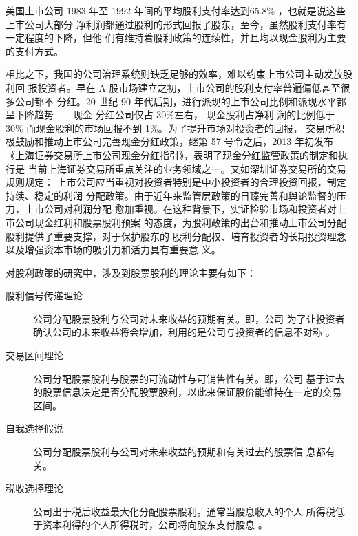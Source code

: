 \documentclass[../main]{subfiles}
\begin{document}
美国上市公司 1983 年至 1992 年间的平均股利支付率达到65.8\%
，\cite{李常青1999我国上市公司股利政策现状及其成因}也就是说这些上市公司大部分
净利润都通过股利的形式回报了股东，至今，虽然股利支付率有一定程度的下降，但他
们有维持着股利政策的连续性，并且均以现金股利为主要的支付方式。

相比之下，我国的公司治理系统则缺乏足够的效率，难以约束上市公司主动发放股利回
报投资者。早在 A 股市场建立之初，上市公司的股利支付率普遍偏低甚至很多公司都不
分红。20 世纪 90 年代后期，进行派现的上市公司比例和派现水平都呈下降趋势——现金
分红公司仅占 30\%左右，\cite{李常青2001股利政策理论与实证研究} 现金股利占净利
润的比例低于 30\% 而现金股利的市场回报不到 1\%。为了提升市场对投资者的回报，
交易所积极鼓励和推动上市公司完善现金分红政策，继第 57 号令之后，2013 年初发布
《上海证券交易所上市公司现金分红指引》，表明了现金分红监管政策的制定和执行是
当前上海证券交易所重点关注的业务领域之一。又如深圳证券交易所的交易规则规定：
上市公司应当重视对投资者特别是中小投资者的合理投资回报，制定持续、稳定的利润
分配政策。由于近年来监管层政策的日臻完善和舆论监督的压力，上市公司对利润分配
愈加重视。在这种背景下，实证检验市场和投资者对上市公司现金红利和股票股利预案
的态度，为股利政策的出台和推动上市公司分配股利提供了重要支撑，对于保护股东的
股利分配权、培育投资者的长期投资理念以及增强资本市场的吸引力和活力具有重要意
义。\cite{Avner1982Stockholder,Kryzanowski2009Trading,Walther2007Stock,
  CHRISTOPHER1987The,Mcnichols1990Stock,Merton1961Dividend,Hong2012Trading,
  Graeme1996Stice}

对股利政策的研究中，涉及到股票股利的理论主要有如下：

\begin{description}
  \item[股利信号传递理论]公司分配股票股利与公司对未来收益的预期有关。即，公司
    为了让投资者确认公司的未来收益将会增加，利用的是公司与投资者的信息不对称
    。\cite{Josef1986Tax,Gerald1992Jensen,Eades1984On,
    Measurement1998the,Vermaelen1983Tax,Lintner1956DISTRIBUTION}
  \item[交易区间理论]公司分配股票股利与股票的可流动性与可销售性有关。即，公司
    基于过去的股票信息决定是否分配股票股利，以此来保证股价能维持在一定的交易
    区间。\cite{Lintner1964Optimal,R2012DIVIDEND,Hersh1984Explaining,
    Stein1989Efficient,Pyung1995Signaling}
  \item[自我选择假说]公司分配股票股利与公司对未来收益的预期和有关过去的股票信
    息都有关。\cite{Sheikh1989Stock,J2014STOCK,Woolridge1983Randall,
    Copeland1979Liquidity}
  \item[税收选择理论]公司出于税后收益最大化分配股票股利。通常当股息收入的个人
    所得税低于资本利得的个人所得税时，公司将向股东支付股息
    。\cite{Mozes1995THE,Muscarella1996Stock,Rozeff1982GROWTH,Bar1977A,
    Paul2000Stock}
\end{description}
\end{document}
